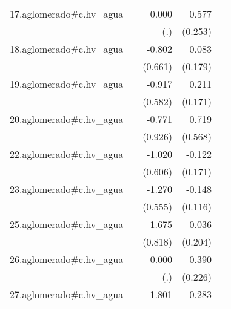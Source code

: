 {\begin{longtable}{l*{4}{D{.}{.}{-1}}}
\addlinespace
17.aglomerado#c.hv\_agua&                     &       0.000         &       0.577\sym{*}  &                     \\
            &                     &         (.)         &     (0.253)         &                     \\
\addlinespace
18.aglomerado#c.hv\_agua&                     &      -0.802         &       0.083         &                     \\
            &                     &     (0.661)         &     (0.179)         &                     \\
\addlinespace
19.aglomerado#c.hv\_agua&                     &      -0.917         &       0.211         &                     \\
            &                     &     (0.582)         &     (0.171)         &                     \\
\addlinespace
20.aglomerado#c.hv\_agua&                     &      -0.771         &       0.719         &                     \\
            &                     &     (0.926)         &     (0.568)         &                     \\
\addlinespace
22.aglomerado#c.hv\_agua&                     &      -1.020         &      -0.122         &                     \\
            &                     &     (0.606)         &     (0.171)         &                     \\
\addlinespace
23.aglomerado#c.hv\_agua&                     &      -1.270\sym{*}  &      -0.148         &                     \\
            &                     &     (0.555)         &     (0.116)         &                     \\
\addlinespace
25.aglomerado#c.hv\_agua&                     &      -1.675\sym{*}  &      -0.036         &                     \\
            &                     &     (0.818)         &     (0.204)         &                     \\
\addlinespace
26.aglomerado#c.hv\_agua&                     &       0.000         &       0.390         &                     \\
            &                     &         (.)         &     (0.226)         &                     \\
\addlinespace
27.aglomerado#c.hv\_agua&                     &      -1.801\sym{*}  &       0.283         &                     \\

\end{longtable}}
